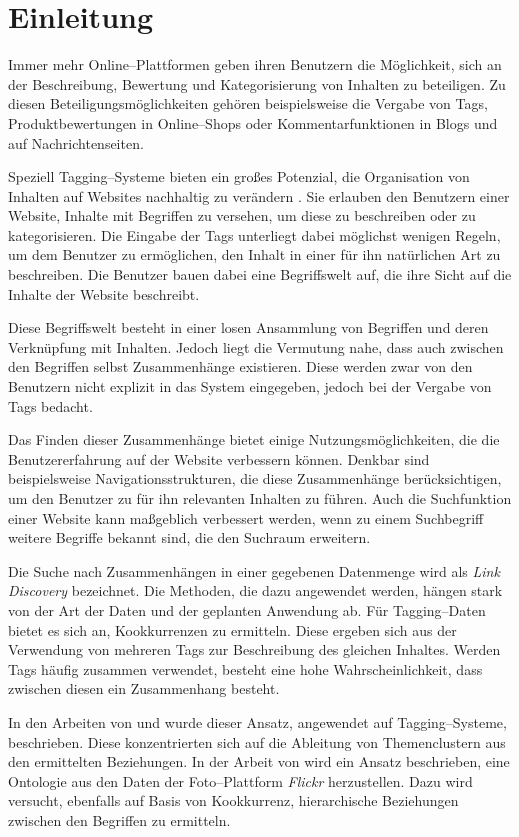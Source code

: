 \chapter{Einleitung}

Immer mehr Online--Plattformen geben ihren Benutzern die Möglichkeit, sich an der Beschreibung, Bewertung und Kategorisierung von Inhalten zu beteiligen. Zu diesen Beteiligungsmöglichkeiten gehören beispielsweise die Vergabe von Tags, Produktbewertungen in Online--Shops oder Kommentarfunktionen in Blogs und auf Nachrichtenseiten. 

Speziell Tagging--Systeme bieten ein großes Potenzial, die Organisation von Inhalten auf Websites nachhaltig zu verändern \cite{sc2005}. Sie erlauben den Benutzern einer Website, Inhalte mit Begriffen zu versehen, um diese zu beschreiben oder zu kategorisieren. Die Eingabe der Tags unterliegt dabei möglichst wenigen Regeln, um dem Benutzer zu ermöglichen, den Inhalt in einer für ihn natürlichen Art zu beschreiben. Die Benutzer bauen dabei eine Begriffswelt auf, die ihre Sicht auf die Inhalte der Website beschreibt.

Diese Begriffswelt besteht in einer losen Ansammlung von Begriffen und deren Verknüpfung mit Inhalten. Jedoch liegt die Vermutung nahe, dass auch zwischen den Begriffen selbst Zusammenhänge existieren. Diese werden zwar von den Benutzern nicht explizit in das System eingegeben, jedoch bei der Vergabe von Tags bedacht.

Das Finden dieser Zusammenhänge bietet einige Nutzungsmöglichkeiten, die die Benutzererfahrung auf der Website verbessern können. Denkbar sind beispielsweise Navigationsstrukturen, die diese Zusammenhänge berücksichtigen, um den Benutzer zu für ihn relevanten Inhalten zu führen. Auch die Suchfunktion einer Website kann maßgeblich verbessert werden, wenn zu einem Suchbegriff weitere Begriffe bekannt sind, die den Suchraum erweitern.

Die Suche nach Zusammenhängen in einer gegebenen Datenmenge wird als \emph{Link Discovery} bezeichnet. Die Methoden, die dazu angewendet werden, hängen stark von der Art der Daten und der geplanten Anwendung ab. Für Tagging--Daten bietet es sich an, Kookkurrenzen zu ermitteln. Diese ergeben sich aus der Verwendung von mehreren Tags zur Beschreibung des gleichen Inhaltes. Werden Tags häufig zusammen verwendet, besteht eine hohe Wahrscheinlichkeit, dass zwischen diesen ein Zusammenhang besteht. 

In den Arbeiten von \textcite{ps2006} und \textcite{kss2010} wurde dieser Ansatz, angewendet auf Tagging--Systeme, beschrieben. Diese konzentrierten sich auf die Ableitung von Themenclustern aus den ermittelten Beziehungen. In der Arbeit von \textcite{ps2006} wird ein Ansatz beschrieben, eine Ontologie aus den Daten der Foto--Plattform \emph{Flickr} herzustellen. Dazu wird versucht, ebenfalls auf Basis von Kookkurrenz, hierarchische Beziehungen zwischen den Begriffen zu ermitteln.

